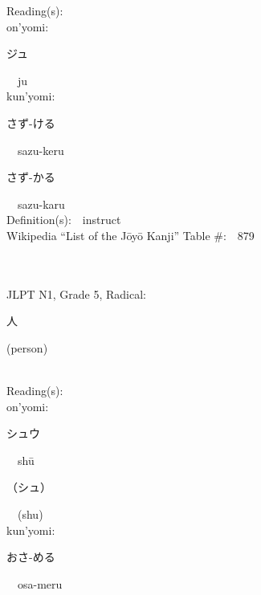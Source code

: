 \begin{multicols}{2}
Reading(s):\ \ \\
{\hspace*{1em}}on'yomi:\ \ \\
{\hspace*{2em}}{\begin{CJK}{UTF8}{min} ジュ \end{CJK}}\ \ ju\ \ \\
{\hspace*{1em}}kun'yomi:\ \ \\
{\hspace*{2em}}{\begin{CJK}{UTF8}{min} さず-ける \end{CJK}}\ \ sazu-keru\ \ \\
{\hspace*{2em}}{\begin{CJK}{UTF8}{min} さず-かる \end{CJK}}\ \ sazu-karu\ \ \\
Definition(s):\ \ instruct \\
Wikipedia ``List of the J\=oy\=o Kanji'' Table \#:\ \ 879 \\
\ \ \\
{\fontsize{34pt}{40pt}  }\ \ \\  %
{JLPT N1, Grade 5, Radical:\ \ {\begin{CJK}{UTF8}{min} 人 \end{CJK}} (person) } \\
Reading(s):\ \ \\
{\hspace*{1em}}on'yomi:\ \ \\
{\hspace*{2em}}{\begin{CJK}{UTF8}{min} シュウ \end{CJK}}\ \ sh\=u\ \ \\
{\hspace*{2em}}{\begin{CJK}{UTF8}{min} （シュ） \end{CJK}}\ \ (shu)\ \ \\
{\hspace*{1em}}kun'yomi:\ \ \\
{\hspace*{2em}}{\begin{CJK}{UTF8}{min} おさ-める \end{CJK}}\ \ osa-meru\ \ \\

\end{multicols}
